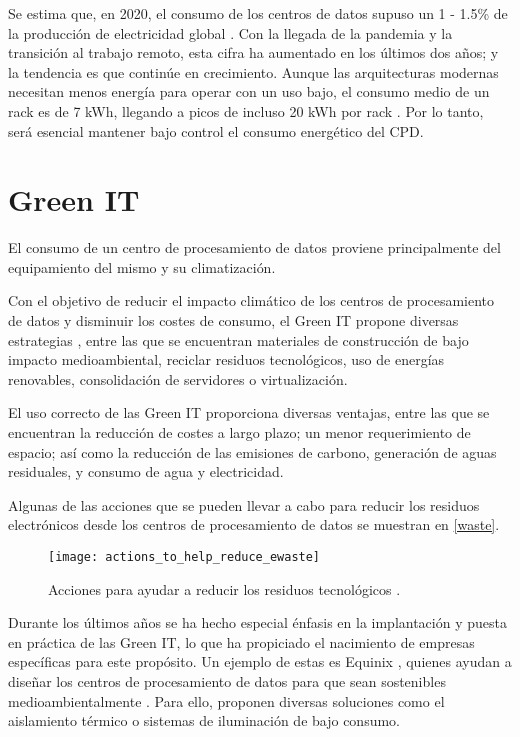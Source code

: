 Se estima que, en 2020, el consumo de los centros de datos supuso un 1 - 1.5\% de la producción de electricidad global \cite{mytton-dc}. Con la llegada de la pandemia y la transición al trabajo remoto, esta cifra ha aumentado en los últimos dos años; y la tendencia es que continúe en crecimiento. Aunque las arquitecturas modernas necesitan menos energía para operar con un uso bajo, el consumo medio de un rack es de 7 kWh, llegando a picos de incluso 20 kWh por rack \cite{datacenters-density}. Por lo tanto, será esencial mantener bajo control el consumo energético del CPD.

\section{Green IT}

El consumo de un centro de procesamiento de datos proviene principalmente del equipamiento del mismo y su climatización.

Con el objetivo de reducir el impacto climático de los centros de procesamiento de datos y disminuir los costes de consumo, el Green IT propone diversas estrategias \cite{techtargetgreen}, entre las que se encuentran materiales de construcción de bajo impacto medioambiental, reciclar residuos tecnológicos, uso de energías renovables, consolidación de servidores o virtualización.

El uso correcto de las Green IT proporciona diversas ventajas, entre las que se encuentran la reducción de costes a largo plazo; un menor requerimiento de espacio; así como la reducción de las emisiones de carbono, generación de aguas residuales, y consumo de agua y electricidad.

Algunas de las acciones que se pueden llevar a cabo para reducir los residuos electrónicos desde los centros de procesamiento de datos se muestran en \eqref{waste}.

\begin{figure}
    \begin{center}
        \texttt{[image: actions\_to\_help\_reduce\_ewaste]}
        \caption{Acciones para ayudar a reducir los residuos tecnológicos \cite{techtargetgreen}.}
        \label{waste}
    \end{center}
\end{figure}

Durante los últimos años se ha hecho especial énfasis en la implantación y puesta en práctica de las Green IT, lo que ha propiciado el nacimiento de empresas específicas para este propósito. Un ejemplo de estas es Equinix \cite{equinix}, quienes ayudan a diseñar los centros de procesamiento de datos para que sean sostenibles medioambientalmente . Para ello, proponen diversas soluciones como el aislamiento térmico o sistemas de iluminación de bajo consumo.

